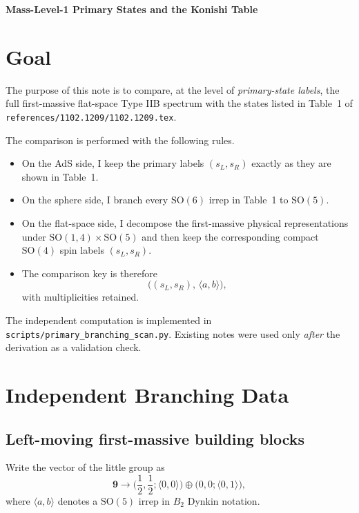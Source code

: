 \documentclass[12pt]{article}
\newcommand{\SO}{\mathrm{SO}}
\newcommand{\la}{\langle}
\newcommand{\ra}{\rangle}
\newcommand{\bb}{\mathbf}
\newcommand{\half}{\frac{1}{2}}
\begin{document}
\sloppy

\begin{center}
{\Large\bf Mass-Level-1 Primary States and the Konishi Table}
\end{center}

\section{Goal}

The purpose of this note is to compare, at the level of \emph{primary-state labels},
the full first-massive flat-space Type IIB spectrum with the states listed in Table~1 of
\texttt{references/1102.1209/1102.1209.tex}.

The comparison is performed with the following rules.
\begin{itemize}
\item On the AdS side, I keep the primary labels $(s_L,s_R)$ exactly as they are shown in Table~1.
\item On the sphere side, I branch every $\SO(6)$ irrep in Table~1 to $\SO(5)$.
\item On the flat-space side, I decompose the first-massive physical representations under
$\SO(1,4)\times \SO(5)$ and then keep the corresponding compact $\SO(4)$ spin labels
$(s_L,s_R)$.
\item The comparison key is therefore
\begin{equation}
\big((s_L,s_R),\,\la a,b\ra\big),
\end{equation}
with multiplicities retained.
\end{itemize}

The independent computation is implemented in
\texttt{scripts/primary\_branching\_scan.py}. Existing notes were used only \emph{after}
the derivation as a validation check.

\section{Independent Branching Data}

\subsection{Left-moving first-massive building blocks}

Write the vector of the little group as
\begin{equation}
\bb 9 \to \Big(\half,\half;\la 0,0\ra\Big)\oplus \Big(0,0;\la 0,1\ra\Big),
\end{equation}
where $\la a,b\ra$ denotes a $\SO(5)$ irrep in $B_2$ Dynkin notation.
\end{document}
